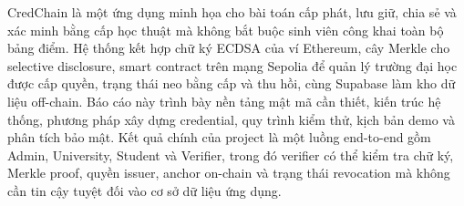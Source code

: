 CredChain là một ứng dụng minh họa cho bài toán cấp phát, lưu giữ, chia sẻ và xác minh bằng cấp học thuật mà không bắt buộc sinh viên công khai toàn bộ bảng điểm. Hệ thống kết hợp chữ ký ECDSA của ví Ethereum, cây Merkle cho selective disclosure, smart contract trên mạng Sepolia để quản lý trường đại học được cấp quyền, trạng thái neo bằng cấp và thu hồi, cùng Supabase làm kho dữ liệu off-chain. Báo cáo này trình bày nền tảng mật mã cần thiết, kiến trúc hệ thống, phương pháp xây dựng credential, quy trình kiểm thử, kịch bản demo và phân tích bảo mật. Kết quả chính của project là một luồng end-to-end gồm Admin, University, Student và Verifier, trong đó verifier có thể kiểm tra chữ ký, Merkle proof, quyền issuer, anchor on-chain và trạng thái revocation mà không cần tin cậy tuyệt đối vào cơ sở dữ liệu ứng dụng.
